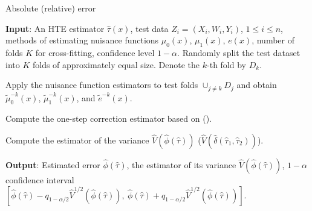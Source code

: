 \documentclass[twoside]{article}
\newcommand{\1}{{\mathbbm{1}}}
\begin{document}
\begin{algorithm}\caption{Absolute (relative) error}\label{algo:absolute.error}
    \begin{algorithmic}[1]
    \STATE \textbf{Input}: An HTE estimator $\hat{\tau}(x)$, test data $Z_i = (X_i, W_i, Y_i)$, $1 \le i \le n$, methods of estimating nuisance functions $\mu_0(x)$, $\mu_1(x)$, $e(x)$, number of folds $K$ for cross-fitting, confidence level $1-\alpha$.
    \STATE Randomly split the test dataset into $K$ folds of approximately equal size. Denote the $k$-th fold by $D_k$.

    
    \STATE Apply the nuisance function estimators to test folds $\cup_{j \neq k} D_j$ and obtain $\tilde{\mu}_{0}^{-k}(x)$, $\tilde{\mu}_{1}^{-k}(x)$, and $\tilde{e}^{-k}(x)$.

    \ENDFOR
    
    \STATE Compute the one-step correction estimator based on  (). 
    
    \STATE Compute the estimator of the variance $\hat{V}(\hat{\phi}(\hat{\tau}))$ ($\hat{V}(\hat{\delta}(\hat{\tau}_1, \hat{\tau}_2))$).
    
    \STATE \textbf{Output}: Estimated error $\hat{\phi}(\hat{\tau})$, the estimator of its variance $\hat{V}(\hat{\phi}(\hat{\tau}))$, $1-\alpha$ confidence interval $\left[\hat{\phi}(\hat{\tau}) - q_{1-\alpha/2} \hat{V}^{1/2}(\hat{\phi}(\hat{\tau})), ~\hat{\phi}(\hat{\tau}) + q_{1-\alpha/2} \hat{V}^{1/2}(\hat{\phi}(\hat{\tau}))\right]$.

    \end{algorithmic}
\end{algorithm}
\end{document}

